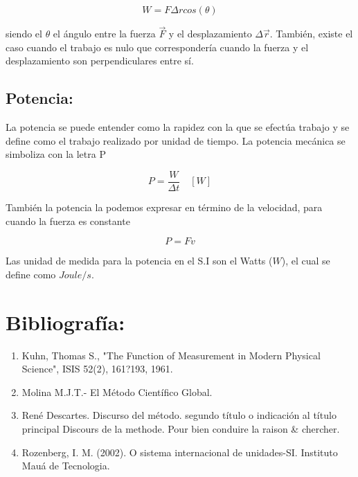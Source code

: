 \documentclass[a5paper,pagesize,10pt,bibtotoc,pointlessnumbers,
normalheadings,DIV=9,fleqn,x11names,table,twoside=false]{scrbook}
\begin{document}
\begin{equation}
W = F\Delta r cos(\theta)
\end{equation}
 
siendo el $\theta$ el ángulo entre la fuerza $\vec{F}$ y el desplazamiento $\Delta \vec{r}$. También, existe el caso cuando el 
trabajo es nulo que correspondería cuando la fuerza y el desplazamiento son perpendiculares entre sí.
  
\section{Potencia:}  

La potencia se puede entender como la rapidez con la que se efectúa trabajo y se define como el trabajo realizado por unidad de 
tiempo. La potencia mecánica se simboliza con la letra P

\begin{equation}
P = \frac{W}{\Delta t}\quad [W]
\end{equation}

También la potencia la podemos expresar en término de la velocidad, para cuando la fuerza es constante

\begin{equation}
P = Fv
\end{equation}

Las unidad de medida para la potencia en el S.I son el Watts ($W$), el cual se define como $Joule/s$.

\chapter*{Bibliografía:}

\begin{enumerate}
 \item Kuhn, Thomas S., "The Function of Measurement in Modern Physical Science", ISIS 52(2), 161?193, 1961.
 \item Molina M.J.T.- El Método Científico Global.
 \item René Descartes. Discurso del método. segundo título o indicación al título principal Discours de la methode. Pour bien 
conduire la raison \& chercher.
 \item Rozenberg, I. M. (2002). O sistema internacional de unidades-SI. Instituto Mauá de Tecnologia.
 \end{enumerate}
\end{document}
